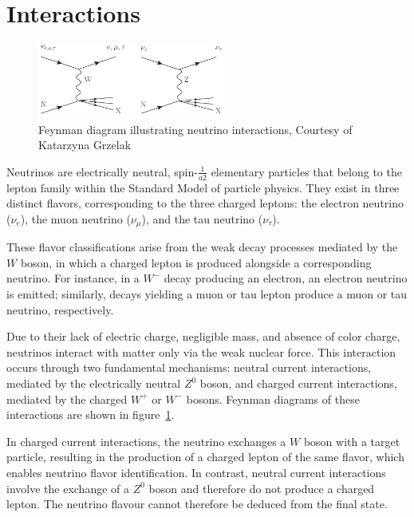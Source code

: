 \documentclass{pracalicmgr}
\begin{document}
\section{Interactions}

\begin{figure}[h]
    \centering
    \includegraphics[width=0.55\textwidth]{src/xfig1_3nu.pdf}
    \caption{Feynman diagram illustrating neutrino interactions, Courtesy of Katarzyna Grzelak}
    \label{fig:Feynman_diagram_neutrino}
\end{figure}

Neutrinos are electrically neutral, spin-$\frac{1}{a2}$ elementary particles that belong to the lepton family within the Standard Model of particle physics. They exist in three distinct flavors, corresponding to the three charged leptons: the electron neutrino ($\nu_e$), the muon neutrino ($\nu_\mu$), and the tau neutrino ($\nu_\tau$).\cite{neutrinoFeynmann}

These flavor classifications arise from the weak decay processes mediated by the $W$ boson, in which a charged lepton is produced alongside a corresponding neutrino. For instance, in a $W^-$ decay producing an electron, an electron neutrino is emitted; similarly, decays yielding a muon or tau lepton produce a muon or tau neutrino, respectively.

Due to their lack of electric charge, negligible mass, and absence of color charge, neutrinos interact with matter only via the weak nuclear force. This interaction occurs through two fundamental mechanisms: neutral current interactions, mediated by the electrically neutral $Z^0$ boson, and charged current interactions, mediated by the charged $W^+$ or $W^-$ bosons. Feynman diagrams of these interactions are shown in figure~\ref{fig:Feynman_diagram_neutrino}.

In charged current interactions, the neutrino exchanges a $W$ boson with a target particle, resulting in the production of a charged lepton of the same flavor, which enables neutrino flavor identification. In contrast, neutral current interactions involve the exchange of a $Z^0$ boson and therefore do not produce a charged lepton. The neutrino flavour cannot therefore be deduced from the final state.
\end{document}
